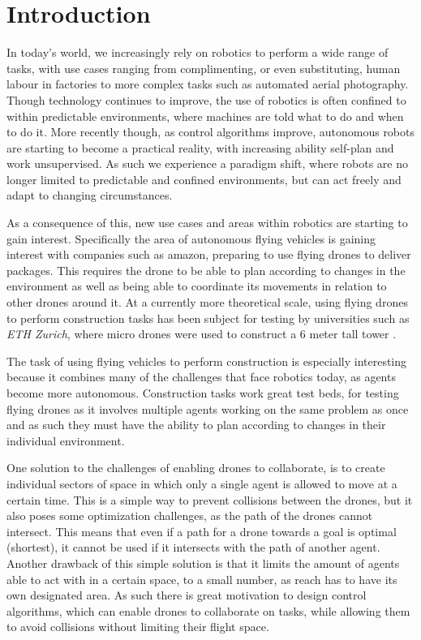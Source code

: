 \chapter{Introduction}

In today's world, we increasingly rely on robotics to perform a wide range of tasks, with use cases ranging from complimenting, or even substituting, human labour in factories to more complex tasks such as automated aerial photography. 
Though technology continues to improve, the use of robotics is often confined to within predictable environments, where machines are told what to do and when to do it. 
More recently though, as control algorithms improve, autonomous robots are starting to become a practical reality, with increasing ability self-plan and work unsupervised. 
As such we experience a paradigm shift, where robots are no longer limited to predictable and confined environments, but can act freely and adapt to changing circumstances. 

As a consequence of this, new use cases and areas within robotics are starting to gain interest. 
Specifically the area of autonomous flying vehicles is gaining interest with companies such as amazon, preparing to use flying drones to deliver packages.
This requires the drone to be able to plan according to changes in the environment as well as being able to coordinate its movements in relation to other drones around it. 
At a currently more theoretical scale, using flying drones to perform construction tasks has been subject for testing by universities such as \textit{ETH Zurich}, where micro drones were used to construct a 6 meter tall tower \cite{augugliaro_flight_2014}. 

The task of using flying vehicles to perform construction is especially interesting because it combines many of the challenges that face robotics today, as agents become more autonomous. 
Construction tasks work great test beds, for testing flying drones as it involves multiple agents working on the same problem as once and as such they must have the ability to plan according to changes in their individual environment. 

One solution to the challenges of enabling drones to collaborate, is to create individual sectors of space in which only a single agent is allowed to move at a certain time. 
This is a simple way to prevent collisions between the drones, but it also poses some optimization challenges, as the path of the drones cannot intersect. 
This means that even if a path for a drone towards a goal is optimal (shortest), it cannot be used if it intersects with the path of another agent. 
Another drawback of this simple solution is that it limits the amount of agents able to act with in a certain space, to a small number, as reach has to have its own designated area. As such there is great motivation to design control algorithms, which can enable drones to collaborate on tasks, while allowing them to avoid collisions without limiting their flight space. 

